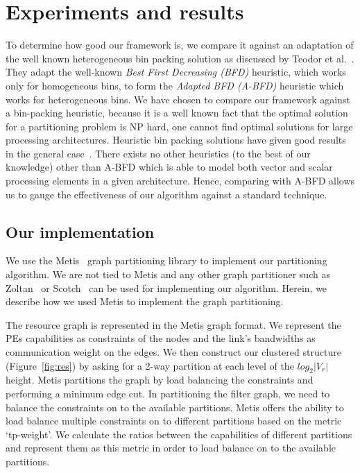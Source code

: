 \section{Experiments and results}
\label{sec:experiments-results}

To determine how good our framework is, we compare it against an
adaptation of the well known heterogeneous bin packing solution as
discussed by Teodor et al.~\cite{tcra11}. They adapt the well-known
\textit{Best First Decreasing (BFD)} heuristic, which works only for
homogeneous bins, to form the \textit{Adapted BFD (A-BFD)} heuristic
which works for heterogeneous bins. We have chosen to compare our
framework against a bin-packing heuristic, because it is a well known
fact that the optimal solution for a partitioning problem is NP hard,
one cannot find optimal solutions for large processing
architectures. Heuristic bin packing solutions have given good results
in the general case~\cite{ecof78}. There exists no other heuristics (to the
best of our knowledge) other than A-BFD which is able to model both vector and
scalar processing elements in a given architecture. Hence, comparing with
A-BFD allows us to gauge the effectiveness of our algorithm against a standard
technique.

\subsection{Our implementation}
\label{sec:our-implementation}

We use the Metis~\cite{gkar95} graph partitioning library to implement
our partitioning algorithm. We are not tied to Metis and any other graph
partitioner such as Zoltan~\cite{kdev09} or Scotch~\cite{cche08} can be
used for implementing our algorithm. Herein, we describe how we used
Metis to implement the graph partitioning.

The resource graph is represented in the Metis graph format. We
represent the PEs capabilities as constraints of the nodes and the
link's bandwidths as communication weight on the edges. We then
construct our clustered structure (Figure~\ref{fig:res}) by asking for a
2-way partition at each level of the $log_2|V_r|$ height. Metis
partitions the graph by load balancing the constraints and performing a
minimum edge cut.  In partitioning the filter graph, we need to balance
the constraints on to the available partitions. Metis offers the ability
to load balance multiple constraints on to different partitions based on
the metric \mbox{`tp-weight'}. We calculate the ratios between the
capabilities of different partitions and represent them as this metric
in order to load balance on to the available partitions.


